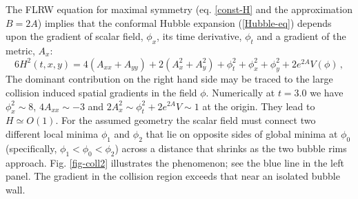 \documentclass[preprintnumbers,eqsecnum,aps,prd,epsf,showpacs,nofootinbib
]{revtex4}
\begin{document}
The FLRW equation for maximal symmetry (eq. \ref{const-H} and the
approximation $B=2A$) implies that the conformal Hubble expansion
(\ref{Hubble-eq}) depends upon the gradient of scalar field, $\phi_x$,
its time derivative, $\phi_t$ and a gradient of the metric, $A_x$:
\begin{equation}
6H^2(t,x,y)=4(A_{xx}+A_{yy}) +2(A_x^2+A_y^2)+\phi_t^2+\phi_x^2+\phi_y^2+2e^{2A}V(\phi)\,,\label{const-H1}
\end{equation}
The dominant contribution on the right hand side may be traced to the
large collision induced spatial gradients in the field $\phi$.
Numerically at $t=3.0$ we have $\phi_x^2\sim 8$, $4 A_{xx}\sim -3$ and
$2A_x^2 \sim \phi_t^2+2 e^{2A}V \sim 1$ at the origin. They lead to
$H\simeq O(1)$.  For the assumed geometry the scalar field must
connect two different local minima $\phi_1$ and $\phi_2$ that lie on
opposite sides of global minima at $\phi_0$ (specifically, $\phi_1 <
\phi_0 < \phi_2$) across a distance that shrinks as the two bubble
rims approach.  Fig. \ref{fig-coll2} illustrates the phenomenon; see
the blue line in the left panel. The gradient in the collision region
exceeds that near an isolated bubble wall.

\newpage

\end{document}
